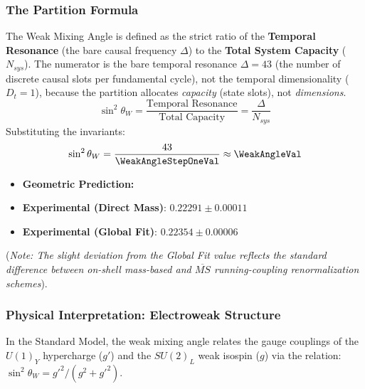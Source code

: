 \subsubsection{The Partition Formula}
The Weak Mixing Angle is defined as the strict ratio of the \textbf{Temporal Resonance} (the bare causal frequency $\Delta$) to the \textbf{Total System Capacity} ($N_{sys}$). The numerator is the bare temporal resonance $\Delta = 43$ (the number of discrete causal slots per fundamental cycle), not the temporal dimensionality ($D_t = 1$), because the partition allocates \textit{capacity} (state slots), not \textit{dimensions}.
\begin{equation}
\sin^2 \theta_W = \frac{\text{Temporal Resonance}}{\text{Total Capacity}} = \frac{\Delta}{N_{sys}}
\end{equation}
Substituting the invariants:
\begin{equation}
\sin^2 \theta_W = \frac{43}{\WeakAngleStepOneVal} \approx \mathbf{\WeakAngleVal}
\end{equation}

\begin{itemize}
    \item \textbf{Geometric Prediction:} \WeakAngleVal
    \item \textbf{Experimental (Direct Mass)}: $0.22291 \pm 0.00011$ \cite{navas_review_2024}
    \item \textbf{Experimental (Global Fit)}: $0.22354 \pm 0.00006$
\end{itemize}
(\textit{Note: The slight deviation from the Global Fit value reflects the standard difference between on-shell mass-based and $\overline{MS}$ running-coupling renormalization schemes}).

\subsubsection{Physical Interpretation: Electroweak Structure}
In the Standard Model, the weak mixing angle relates the gauge couplings of the $U(1)_Y$ hypercharge ($g'$) and the $SU(2)_L$ weak isospin ($g$) via the relation: $\sin^2\theta_W = g'^2 / (g^2 + g'^2)$.

